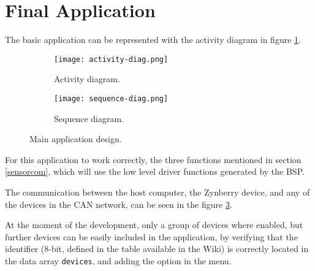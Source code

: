 

\section{Final Application}

The basic application can be represented with the activity diagram in figure \ref{fig:activity-diag}.

\begin{figure}[htp]
	\centering
	\begin{subfigure}{0.45\textwidth}
		\texttt{[image: activity-diag.png]}
		\caption{Activity diagram.} \label{fig:activity-diag}
	\end{subfigure} \hfill
	\begin{subfigure}{0.45\textwidth}
		\texttt{[image: sequence-diag.png]}
		\caption{Sequence diagram.} \label{fig:sequence-diag}
	\end{subfigure}%
	\caption{Main application design.}
\end{figure}%

For this application to work correctly, the three functions mentioned in section \ref{sensorcom}, which will use the low level driver functions generated by the BSP.

The communication between the host computer, the Zynberry device, and any of the devices in the CAN network, can be seen in the figure \ref{fig:sequence-diag}.

At the moment of the development, only a group of devices where enabled, but further devices can be easily included in the application, by verifying that the identifier (8-bit, defined in the table available in the Wiki) is correctly located in the data array \texttt{devices}, and adding the option in the menu.



